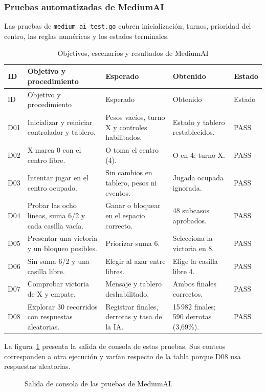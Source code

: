 \documentclass[12pt,a4paper]{article}
\begin{document}
\subsubsection{Pruebas automatizadas de MediumAI}
Las pruebas de \texttt{medium\_ai\_test.go} cubren inicializaci\'on, turnos,
prioridad del centro, las reglas num\'ericas y los estados terminales.
\begin{longtable}{p{1cm}p{3.4cm}p{3.3cm}p{3.4cm}p{1.6cm}}
\caption{Objetivos, escenarios y resultados de MediumAI}\\
\toprule ID & Objetivo y procedimiento & Esperado & Obtenido & Estado\\\midrule\endfirsthead
\toprule ID & Objetivo y procedimiento & Esperado & Obtenido & Estado\\\midrule\endhead
D01 & Inicializar y reiniciar controlador y tablero. & Pesos vac\'ios, turno X y controles habilitados. & Estado y tablero restablecidos. & PASS\\
D02 & X marca 0 con el centro libre. & O toma el centro (4). & O en 4; turno X. & PASS\\
D03 & Intentar jugar en el centro ocupado. & Sin cambios en tablero, pesos ni eventos. & Jugada ocupada ignorada. & PASS\\
D04 & Probar las ocho l\'ineas, suma 6/2 y cada casilla vac\'ia. & Ganar o bloquear en el espacio correcto. & 48 subcasos aprobados. & PASS\\
D05 & Presentar una victoria y un bloqueo posibles. & Priorizar suma 6. & Selecciona la victoria en 8. & PASS\\
D06 & Sin suma 6/2 y una casilla libre. & Elegir al azar entre libres. & Elige la casilla libre 4. & PASS\\
D07 & Comprobar victoria de X y empate. & Mensaje y tablero deshabilitado. & Ambos finales correctos. & PASS\\
D08 & Explorar 30 recorridos con respuestas aleatorias. & Registrar finales, derrotas y tasa de la IA. & 15\,982 finales; 590 derrotas (3,69\%). & PASS\\
\bottomrule
\end{longtable}
La figura~\ref{fig:consola-medium} presenta la salida de consola de estas pruebas. Sus conteos
corresponden a otra ejecución y varían respecto de la tabla porque D08 usa respuestas aleatorias.

\begin{figure}[H]

\caption{Salida de consola de las pruebas de MediumAI.}
\label{fig:consola-medium}
\end{figure}
\end{document}
